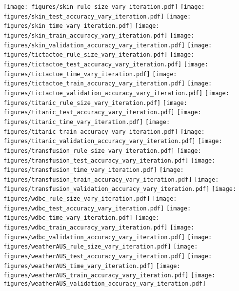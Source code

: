 	\begin{figure*}
	
	\texttt{[image: figures/skin\_rule\_size\_vary\_iteration.pdf]}
	\texttt{[image: figures/skin\_test\_accuracy\_vary\_iteration.pdf]}
	\texttt{[image: figures/skin\_time\_vary\_iteration.pdf]}
	\texttt{[image: figures/skin\_train\_accuracy\_vary\_iteration.pdf]}
	\texttt{[image: figures/skin\_validation\_accuracy\_vary\_iteration.pdf]}
	\texttt{[image: figures/tictactoe\_rule\_size\_vary\_iteration.pdf]}
	\texttt{[image: figures/tictactoe\_test\_accuracy\_vary\_iteration.pdf]}
	\texttt{[image: figures/tictactoe\_time\_vary\_iteration.pdf]}
	\texttt{[image: figures/tictactoe\_train\_accuracy\_vary\_iteration.pdf]}
	\texttt{[image: figures/tictactoe\_validation\_accuracy\_vary\_iteration.pdf]}
	\texttt{[image: figures/titanic\_rule\_size\_vary\_iteration.pdf]}
	\texttt{[image: figures/titanic\_test\_accuracy\_vary\_iteration.pdf]}
	\texttt{[image: figures/titanic\_time\_vary\_iteration.pdf]}
	\texttt{[image: figures/titanic\_train\_accuracy\_vary\_iteration.pdf]}
	\texttt{[image: figures/titanic\_validation\_accuracy\_vary\_iteration.pdf]}
	\texttt{[image: figures/transfusion\_rule\_size\_vary\_iteration.pdf]}
	\texttt{[image: figures/transfusion\_test\_accuracy\_vary\_iteration.pdf]}
	\texttt{[image: figures/transfusion\_time\_vary\_iteration.pdf]}
	\texttt{[image: figures/transfusion\_train\_accuracy\_vary\_iteration.pdf]}
	\texttt{[image: figures/transfusion\_validation\_accuracy\_vary\_iteration.pdf]}
	\texttt{[image: figures/wdbc\_rule\_size\_vary\_iteration.pdf]}
	\texttt{[image: figures/wdbc\_test\_accuracy\_vary\_iteration.pdf]}
	\texttt{[image: figures/wdbc\_time\_vary\_iteration.pdf]}
	\texttt{[image: figures/wdbc\_train\_accuracy\_vary\_iteration.pdf]}
	\texttt{[image: figures/wdbc\_validation\_accuracy\_vary\_iteration.pdf]}
	\texttt{[image: figures/weatherAUS\_rule\_size\_vary\_iteration.pdf]}
	\texttt{[image: figures/weatherAUS\_test\_accuracy\_vary\_iteration.pdf]}
	\texttt{[image: figures/weatherAUS\_time\_vary\_iteration.pdf]}
	\texttt{[image: figures/weatherAUS\_train\_accuracy\_vary\_iteration.pdf]}
	\texttt{[image: figures/weatherAUS\_validation\_accuracy\_vary\_iteration.pdf]}
\end{figure*}



